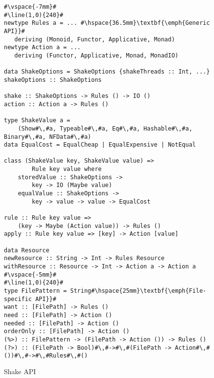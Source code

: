\begin{figure}
\begin{lstlisting}
#\vspace{-7mm}#
#\line(1,0){240}#
newtype Rules a = ... #\hspace{36.5mm}\textbf{\emph{Generic API}}#
   deriving (Monoid, Functor, Applicative, Monad)
newtype Action a = ...
   deriving (Functor, Applicative, Monad, MonadIO)

data ShakeOptions = ShakeOptions {shakeThreads :: Int, ...}
shakeOptions :: ShakeOptions

shake :: ShakeOptions -> Rules () -> IO ()
action :: Action a -> Rules ()

type ShakeValue a =
    (Show#\,#a, Typeable#\,#a, Eq#\,#a, Hashable#\,#a, Binary#\,#a, NFData#\,#a)
data EqualCost = EqualCheap | EqualExpensive | NotEqual

class (ShakeValue key, ShakeValue value) =>
        Rule key value where
    storedValue :: ShakeOptions ->
        key -> IO (Maybe value)
    equalValue :: ShakeOptions ->
        key -> value -> value -> EqualCost

rule :: Rule key value =>
    (key -> Maybe (Action value)) -> Rules ()
apply :: Rule key value => [key] -> Action [value]

data Resource
newResource :: String -> Int -> Rules Resource
withResource :: Resource -> Int -> Action a -> Action a
#\vspace{-5mm}#
#\line(1,0){240}#
type FilePattern = String#\hspace{25mm}\textbf{\emph{File-specific API}}#
want :: [FilePath] -> Rules ()
need :: [FilePath] -> Action ()
needed :: [FilePath] -> Action ()
orderOnly :: [FilePath] -> Action ()
(%>) :: FilePattern -> (FilePath -> Action ()) -> Rules ()
(?>) :: (FilePath -> Bool)#\,#->#\,#(FilePath -> Action#\,#())#\,#->#\,#Rules#\,#()
\end{lstlisting}

\caption{Shake API\label{fig:shake-api}}
\end{figure}

%

